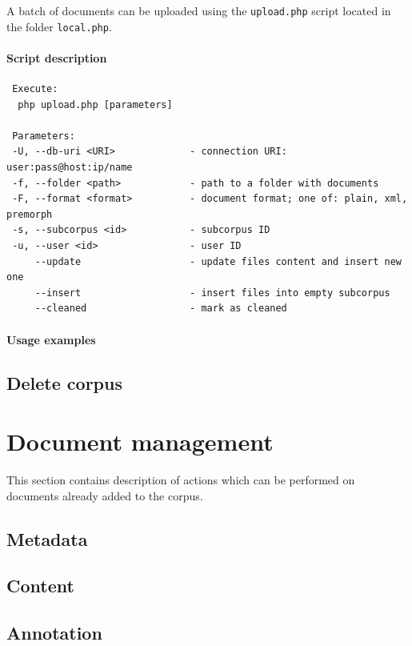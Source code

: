 \documentclass[a4paper,10pt,oneside]{scrbook}
\begin{document}
A batch of documents can be uploaded using the \verb|upload.php| script located in the folder \verb|local.php|.

\subsubsection{Script description}
\begin{verbatim}
 Execute: 
  php upload.php [parameters]

 Parameters: 
 -U, --db-uri <URI>             - connection URI: user:pass@host:ip/name
 -f, --folder <path>            - path to a folder with documents
 -F, --format <format>          - document format; one of: plain, xml, premorph
 -s, --subcorpus <id>           - subcorpus ID
 -u, --user <id>                - user ID
     --update                   - update files content and insert new one
     --insert                   - insert files into empty subcorpus
     --cleaned                  - mark as cleaned 
\end{verbatim}

\subsubsection{Usage examples}



\section{Delete corpus}


\chapter{Document management}
This section contains description of actions which can be performed on documents already added to the corpus.

\section{Metadata}


\section{Content}


\section{Annotation}
\end{document}

